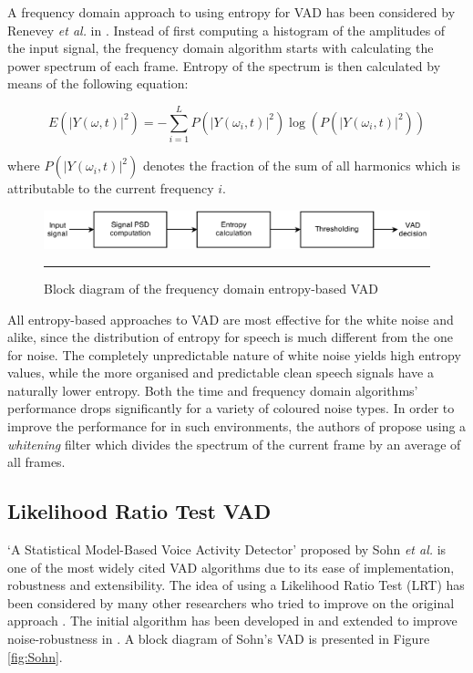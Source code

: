 A frequency domain approach to using entropy for VAD has been considered by Renevey \emph{et al.} in \cite{Renevey}. Instead of first computing a histogram of the amplitudes of the input signal, the frequency domain algorithm starts with calculating the power spectrum of each frame. Entropy of the spectrum is then calculated by means of the following equation:

\begin{equation}
E( \left |  Y \left ( \omega, t \right ) \right |^{2} ) = - \sum_{i=1}^{L} P( \left |  Y \left ( \omega_i, t \right ) \right |^{2} ) \log \left( P( \left |  Y \left ( \omega_i, t \right ) \right |^{2} ) \right)
\end{equation}

where $P( \left |  Y \left ( \omega_i, t \right ) \right |^{2} )$ denotes the fraction of the sum of all harmonics which is attributable to the current frequency $i$.

\begin{figure}[htbp]
	\centering
		\includegraphics[width=0.9\columnwidth]{Figures/Chapter2/Renevey.png}
		\rule{37em}{0.5pt}
	\caption[Block diagram of the frequency domain entropy-based VAD]{Block diagram of the frequency domain entropy-based VAD \cite{Renevey}}
	\label{fig:Renevey}
\end{figure}

All entropy-based approaches to VAD are most effective for the white noise and alike, since the distribution of entropy for speech is much different from the one for noise. The completely unpredictable nature of white noise yields high entropy values, while the more organised and predictable clean speech signals have a naturally lower entropy. Both the time and frequency domain algorithms' performance drops significantly for a variety of coloured noise types. In order to improve the performance for in such environments, the authors of \cite{Renevey} propose using a \emph{whitening} filter which divides the spectrum of the current frame by an average of all frames.

\subsection{Likelihood Ratio Test VAD}
\label{ssec:LRT}

`A Statistical Model-Based Voice Activity Detector' proposed by Sohn \emph{et al.} \cite{Sohn} is one of the most widely cited VAD algorithms due to its ease of implementation, robustness and extensibility. The idea of using a Likelihood Ratio Test (LRT) has been considered by many other researchers who tried to improve on the original approach \cite{ImprovedLikelihood, Cho}. The initial algorithm has been developed in \cite{SohnInitial} and extended to improve noise-robustness in \citep{Sohn}. A block diagram of Sohn's VAD is presented in Figure \ref{fig:Sohn}.

